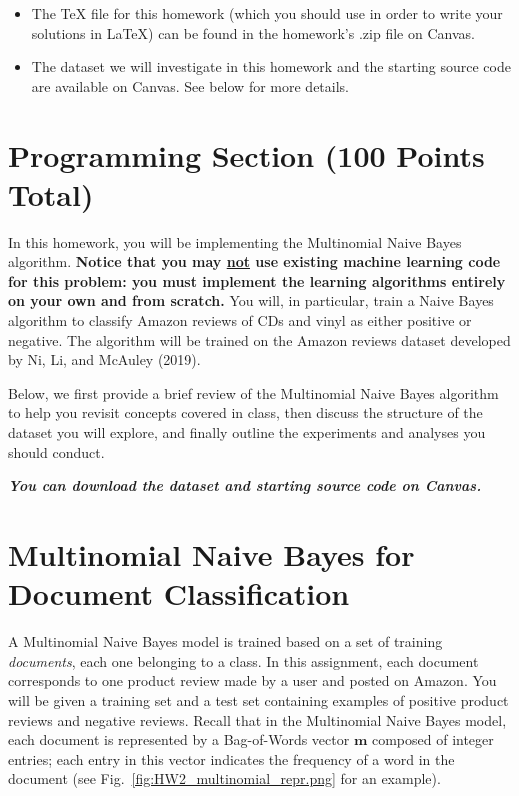 \documentclass[letterpaper]{article}
\begin{document}
\begin{itemize}
    \item The TeX file for this homework (which you should use in order to write your solutions in \LaTeX) can be found in the homework's .zip file on Canvas.

    \item The dataset we will investigate in this homework and the starting source code are available on Canvas. See below for more details.
    
\end{itemize}

\newpage

\vspace{1cm}
\section*{Programming Section (100 Points Total)}

In this homework, you will be implementing the Multinomial Naive Bayes algorithm. \textbf{Notice that you may \ul{not} use existing machine learning code for this problem: you must implement the learning algorithms entirely on your own and from scratch.} 
%
You will, in particular, train a Naive Bayes algorithm to classify Amazon reviews of CDs and vinyl as either positive or negative. The algorithm will be trained on the Amazon reviews dataset developed by Ni, Li, and McAuley (2019). 

\noindent Below, we first provide a brief review of the Multinomial Naive Bayes algorithm to help you revisit concepts covered in class, then discuss the structure of the dataset you will explore, and finally outline the experiments and analyses you should conduct.

\noindent \emph{\textbf{You can download the dataset and starting source code on Canvas.}}

\section{Multinomial Naive Bayes for Document Classification}

A Multinomial Naive Bayes model is trained based on a set of training \textit{documents}, each one belonging to a class. In this assignment, each document corresponds to one product review made by a user and posted on Amazon. You will be given a training set and a test set containing examples of positive product reviews and negative reviews. Recall that in the Multinomial Naive Bayes model, each document is represented by a Bag-of-Words vector $\mathbf{m}$ composed of integer entries; each entry in this vector indicates the frequency of a word in the document (see Fig.~\ref{fig:HW2_multinomial_repr.png} for an example).
\end{document}
